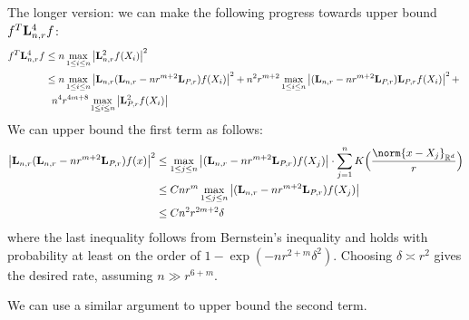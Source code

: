 \documentclass{article}
\newcommand{\Reals}{\mathbb{R}}
\newcommand{\abs}[1]{\left \lvert #1 \right \rvert}
\newcommand{\1}{\mathbf{1}}
\newcommand{\Rd}{\Reals^d}
\newcommand{\Lap}{{\bf L}}
\theoremstyle{alden}
\theoremstyle{aldenthm}
\theoremstyle{definition}
\theoremstyle{remark}
\begin{document}
The longer version: we can make the following progress towards upper bound $f^T \Lap_{n,r}^4 f$:
\begin{align*}
f^T \Lap_{n,r}^4 f & \leq n \max_{1 \leq i \leq n} \abs{\Lap_{n,r}^2 f(X_i)}^2 \\
& \leq n \max_{1 \leq i \leq n} \abs{\Lap_{n,r}(\Lap_{n,r} - nr^{m + 2}\Lap_{P,r})f(X_i)}^2 + n^2 r^{m + 2} \max_{1 \leq i \leq n} \abs{(\Lap_{n,r} - nr^{m + 2}\Lap_{P,r})\Lap_{P,r}f(X_i)}^2 +~\\
& ~~n^4 r^{4m + 8} \max_{1 \leq i \leq n} \abs{\Lap_{P,r}^2f(X_i)}
\end{align*}
We can upper bound the first term as follows:
\begin{align*}
\abs{\Lap_{n,r}(\Lap_{n,r} - nr^{m + 2}\Lap_{P,r})f(x)}^2 & \leq \max_{1 \leq j \leq n} \abs{(\Lap_{n,r} - nr^{m + 2}\Lap_{P,r})f(X_j)} \cdot \sum_{j = 1}^{n} K\Bigl(\frac{\norm{x - X_j}_{\Rd}}{r}\Bigr) \\
& \leq C nr^m \max_{1 \leq j \leq n} \abs{(\Lap_{n,r} - nr^{m + 2}\Lap_{P,r})f(X_j)} \\
& \leq C n^2r^{2m + 2} \delta 
\end{align*}
where the last inequality follows from Bernstein's inequality and holds with probability at least on the order of $1 - \exp(-nr^{2 + m}\delta^2)$. Choosing $\delta \asymp r^2$ gives the desired rate, assuming $n \gg r^{6 + m}$.

We can use a similar argument to upper bound the second term.
\end{document}
